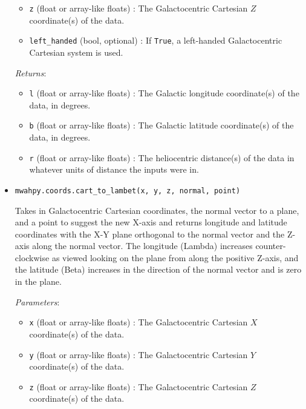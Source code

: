 \documentclass{article}
\begin{document}
\begin{itemize}
\begin{itemize}
\item \verb!z! (float or array-like floats) : The Galactocentric Cartesian $Z$ coordinate(s) of the data.

\item \verb!left_handed! (bool, optional) : If \verb!True!, a left-handed Galactocentric Cartesian system is used.

\end{itemize}

\textit{Returns}: \begin{itemize}

\item \verb!l! (float or array-like floats) : The Galactic longitude coordinate(s) of the data, in degrees.

\item \verb!b! (float or array-like floats) : The Galactic latitude coordinate(s) of the data, in degrees.

\item \verb!r! (float or array-like floats) : The heliocentric distance(s) of the data in whatever units of distance the inputs were in.

\end{itemize}



\item \verb!mwahpy.coords.cart_to_lambet(x, y, z, normal, point)!

Takes in Galactocentric Cartesian coordinates, the normal vector to a plane, and a point to suggest the new X-axis and returns longitude and latitude coordinates with the X-Y plane orthogonal to the normal vector and the Z-axis along the normal vector. The longitude (Lambda) increases counter-clockwise as viewed looking on the plane from along the positive Z-axis, and the latitude (Beta) increases in the direction of the normal vector and is zero in the plane.

\textit{Parameters}: \begin{itemize}

\item \verb!x! (float or array-like floats) : The Galactocentric Cartesian $X$ coordinate(s) of the data.

\item \verb!y! (float or array-like floats) : The Galactocentric Cartesian $Y$ coordinate(s) of the data.

\item \verb!z! (float or array-like floats) : The Galactocentric Cartesian $Z$ coordinate(s) of the data.


\end{itemize}
\end{itemize}
\end{document}
